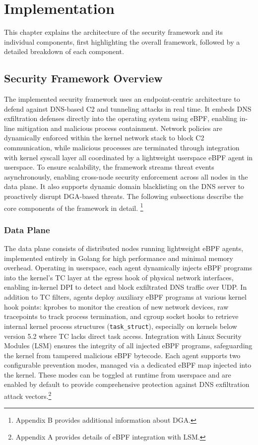 \documentclass [11pt, proquest] {uwthesis}[2020/02/24]
\begin{document}
\chapter{Implementation}
This chapter explains the architecture of the security framework and its individual components, first highlighting the overall framework, followed by a detailed breakdown of each component.
\section{Security Framework Overview}
The implemented security framework uses an endpoint-centric architecture to defend against DNS-based C2 and tunneling attacks in real time. It embeds DNS exfiltration defenses directly into the operating system using eBPF, enabling in-line mitigation and malicious process containment. Network policies are dynamically enforced within the kernel network stack to block C2 communication, while malicious processes are terminated through integration with kernel syscall layer all coordinated by a lightweight userspace eBPF agent in userspace. To ensure scalability, the framework streams threat events asynchronously, enabling cross-node security enforcement across all nodes in the data plane. It also supports dynamic domain blacklisting on the DNS server to proactively disrupt DGA-based threats. The following subsections describe the core components of the framework in detail. \footnote{Appendix B provides additional information about DGA.}


\subsection{Data Plane}
The data plane consists of distributed nodes running lightweight eBPF agents, implemented entirely in Golang for high performance and minimal memory overhead. Operating in userspace, each agent dynamically injects eBPF programs into the kernel’s TC layer at the egress hook of physical network interfaces, enabling in-kernel DPI to detect and block exfiltrated DNS traffic over UDP. In addition to TC filters, agents deploy auxiliary eBPF programs at various kernel hook points: kprobes to monitor the creation of new network devices, raw tracepoints to track process termination, and cgroup socket hooks to retrieve internal kernel process structures (\texttt{task\_struct}), especially on kernels below version 5.2 where TC lacks direct task access. Integration with Linux Security Modules (LSM) ensures the integrity of all injected eBPF programs, safeguarding the kernel from tampered malicious eBPF bytecode. Each agent supports two configurable prevention modes, managed via a dedicated eBPF map injected into the kernel. These modes can be toggled at runtime from userspace and are enabled by default to provide comprehensive protection against DNS exfiltration attack vectors.\footnote{Appendix A provides details of eBPF integration with LSM.}
\end{document}
